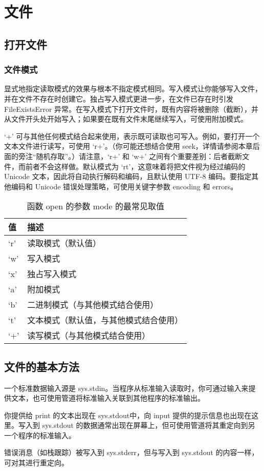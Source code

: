 \chapter{文件\label{ch11}}
\section{打开文件}
\subsection{文件模式}
显式地指定读取模式的效果与根本不指定模式相同。写入模式让你能够写入文件，并在文件不存在时创建它。独占写入模式更进一步，在文件已存在时引发 FileExistsError 异常。在写入模式下打开文件时，既有内容将被删除（截断），并从文件开头处开始写入；如果要在既有文件末尾继续写入，可使用附加模式。

`+' 可与其他任何模式结合起来使用，表示既可读取也可写入。例如，要打开一个文本文件进行读写，可使用 `r+'。（你可能还想结合使用 seek，详情请参阅本章后面的旁注“随机存取”。）请注意，`r+' 和 `w+' 之间有个重要差别：后者截断文件，而前者不会这样做。默认模式为 `rt'，这意味着将把文件视为经过编码的 Unicode 文本，因此将自动执行解码和编码，且默认使用 UTF-8 编码。要指定其他编码和 Unicode 错误处理策略，可使用关键字参数 encoding 和 errors。
\begin{table}
    \centering
    \caption{函数 open 的参数 mode 的最常见取值}
    \label{tbl11-1}
    \begin{tabular}{ll}
        \hline
        值   & 描述                  \\
        \hline
        `r' & 读取模式（默认值）           \\
        `w' & 写入模式                \\
        `x' & 独占写入模式              \\
        `a' & 附加模式                \\
        `b' & 二进制模式（与其他模式结合使用）    \\
        `t' & 文本模式（默认值，与其他模式结合使用） \\
        `+' & 读写模式（与其他模式结合使用）     \\
        \hline
    \end{tabular}
\end{table}
\section{文件的基本方法}
\begin{tcolorbox}[title=三个标准流]
    一个标准数据输入源是 sys.stdin。当程序从标准输入读取时，你可通过输入来提供文本，也可使用管道将标准输入关联到其他程序的标准输出。

    你提供给 print 的文本出现在 sys.stdout中，向 input 提供的提示信息也出现在这里。写入到 sys.stdout 的数据通常出现在屏幕上，但可使用管道将其重定向到另一个程序的标准输入。

    错误消息（如栈跟踪）被写入到 sys.stderr，但与写入到 sys.stdout 的内容一样，可对其进行重定向。
\end{tcolorbox}